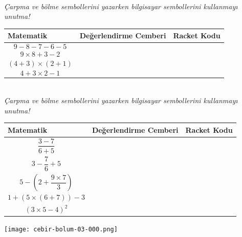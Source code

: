 \documentclass[12pt, a4paper]{article}
\begin{document}
\newpage
{}\\
\textit{Çarpma ve bölme sembollerini yazarken bilgisayar sembollerini kullanmayı unutma!}\\[2ex]
\begin{tabular}{| C{4cm} | C{6cm} | C{6cm} |  }
\hline
\bf Matematik&\bf Değerlendirme Cemberi&\bf Racket Kodu\\
\hline
\begin{displaymath} 9-8-7-6-5 \end{displaymath}  & &  \\[24ex]
\hline
\begin{displaymath} 9 \times 8 + 3 - 2 \end{displaymath} & &  \\[24ex]
\hline
\begin{displaymath} (4+3) \times (2+1) \end{displaymath}  & &  \\[24ex]
\hline
\begin{displaymath} 4+3 \times 2 - 1 \end{displaymath}   & &  \\[24ex]
\hline
\end{tabular}
\newpage
{}\\
\textit{Çarpma ve bölme sembollerini yazarken bilgisayar sembollerini kullanmayı unutma!}\\[2ex]
\begin{tabular}{| C{4cm} | C{6cm} | C{6cm} |  }
\hline
\bf Matematik&\bf Değerlendirme Cemberi&\bf Racket Kodu\\
\hline
\begin{displaymath} \frac {3 - 7 }{6 + 5} \end{displaymath}  & &  \\[20ex]
\hline
\begin{displaymath} 3 - \frac {7}{6} + 5 \end{displaymath} & &  \\[20ex]
\hline
\begin{displaymath} 5 - (2 + \frac{9 \times 7}{3}) \end{displaymath}  & &  \\[20ex]
\hline
\begin{displaymath} 1+(5 \times (6+7))-3 \end{displaymath}   & &  \\[20ex]
\hline
\begin{displaymath} (3 \times 5 - 4)^2 \end{displaymath}   & &  \\[20ex]
\hline
\end{tabular}
\newpage
\texttt{[image: cebir-bolum-03-000.png]}
\newpage
\end{document}
